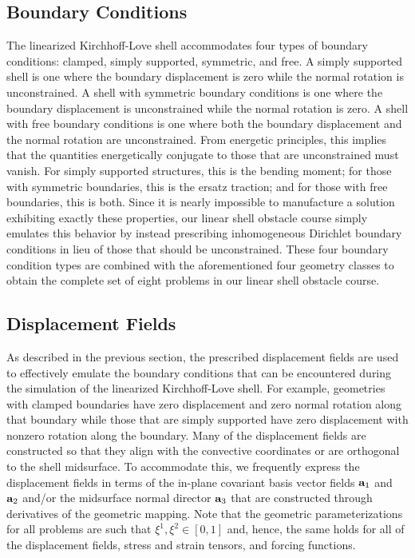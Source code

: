 \documentclass[10pt]{article}
\numberwithin{equation}{section}
\begin{document}
\subsection*{Boundary Conditions}

The linearized Kirchhoff-Love shell accommodates four types of boundary conditions: clamped, simply supported, symmetric, and free. A simply supported shell is one where the boundary displacement is zero while the normal rotation is unconstrained. A shell with symmetric boundary conditions is one where the boundary displacement is unconstrained while the normal rotation is zero. A shell with free boundary conditions is one where both the boundary displacement and the normal rotation are unconstrained. From energetic principles, this implies that the quantities energetically conjugate to those that are unconstrained must vanish. For simply supported structures, this is the bending moment; for those with symmetric boundaries, this is the ersatz traction; and for those with free boundaries, this is both. Since it is nearly impossible to manufacture a solution exhibiting exactly these properties, our linear shell obstacle course simply emulates this behavior by instead prescribing inhomogeneous Dirichlet boundary conditions in lieu of those that should be unconstrained. These four boundary condition types are combined with the aforementioned four geometry classes to obtain the complete set of eight problems in our linear shell obstacle course.

\subsection*{Displacement Fields}

As described in the previous section, the prescribed displacement fields are used to effectively emulate the boundary conditions that can be encountered during the simulation of the linearized Kirchhoff-Love shell. For example, geometries with clamped boundaries have zero displacement and zero normal rotation along that boundary while those that are simply supported have zero displacement with nonzero rotation along the boundary. Many of the displacement fields are constructed so that they align with the convective coordinates or are orthogonal to the shell midsurface. To accommodate this, we frequently express the displacement fields in terms of the in-plane covariant basis vector fields ${\bf a}_1$ and ${\bf a}_2$ and/or the midsurface normal director ${\bf a}_3$ that are constructed through derivatives of the geometric mapping. Note that the geometric parameterizations for all problems are such that $\xi^1,\xi^2 \in [0,1]$ and, hence, the same holds for all of the displacement fields, stress and strain tensors, and forcing functions.
\end{document}

